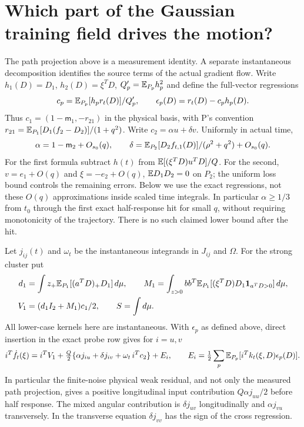 \documentclass[11pt]{article}
\begin{document}
\section{Which part of the Gaussian training field drives the motion?}
The path projection above is a measurement identity. A separate
instantaneous decomposition identifies the source terms of the
actual gradient flow. Write $h_1(D)=D_1$, $h_2(D)=\xi^TD$,
$Q_p'=\mathbb E_{P_p} h_p^2$ and define the full-vector regressions
\[
 c_p=\mathbb E_{P_p}[h_p r_t(D)]/Q_p',\qquad
 \epsilon_p(D)=r_t(D)-c_p h_p(D).
\]
Thus $c_1=(1-\mathsf m_1,-r_{21})$ in the physical basis, with
P's convention $r_{21}=\mathbb E_{P_1}[D_1(f_2-D_2)]/(1+q^2)$.
Write $c_2=\alpha u+\delta v$. Uniformly in actual time,
\begin{equation}\label{an04spmv1:cross}
 \alpha=1-\mathsf m_2+O_{s_0}(q),\qquad
 \delta=\mathbb E_{P_2}[D_2 f_{t,1}(D)]/(\rho^2+q^2)+O_{s_0}(q).
\end{equation}
For the first formula subtract $h(t)$ from
$\mathbb E[(\xi^TD)u^TD]/Q$. For the second, $v=e_1+O(q)$ and
$\xi=-e_2+O(q)$, $\mathbb E D_1D_2=0$ on $P_2$; the uniform loss bound
controls the remaining errors. Below we use the exact regressions,
not these $O(q)$ approximations inside scaled time integrals.
In particular $\alpha\ge1/3$ from $t_0$ through the first exact
half-response hit for small $q$, without requiring monotonicity
of the trajectory. There is no such claimed lower bound after the hit.

Let $j_{ij}(t)$ and $\omega_t$ be the instantaneous integrands in
$J_{ij}$ and $\Omega$. For the strong cluster put
\begin{align*}
 d_1&=\int z_+\mathbb E_{P_1}[(a^TD)_+D_1]\,d\mu,\qquad
 M_1=\int_{z>0}bb^T\mathbb E_{P_1}[(\xi^TD)D_1{\bf1}_{a^TD>0}]\,d\mu,\\
 V_1&=(d_1I_2+M_1)c_1/2,\qquad S=\int d\mu .
\end{align*}
All lower-case kernels here are instantaneous. With
$\epsilon_p$ as defined above, direct insertion in the exact probe row
gives for $i=u,v$
\begin{equation}\label{an04spmv1:sources}
 i^T\dot f_t(\xi)=
 i^TV_1+\tfrac Q2\{\alpha j_{iu}+\delta j_{iv}
                        +\omega_t\,i^Tc_2\}+E_i,\qquad
 E_i=\tfrac12\sum_p\mathbb E_{P_p}[i^Tk_t(\xi,D)\epsilon_p(D)] .
\end{equation}
In particular the finite-noise physical weak residual, and not only
the measured path projection, gives a positive longitudinal input
contribution $Q\alpha j_{uu}/2$ before half response.
The mixed angular contribution is $\delta j_{uv}$ longitudinally
and $\alpha j_{vu}$ transversely. In the transverse equation
$\delta j_{vv}$ has the sign of the cross regression.
\end{document}
